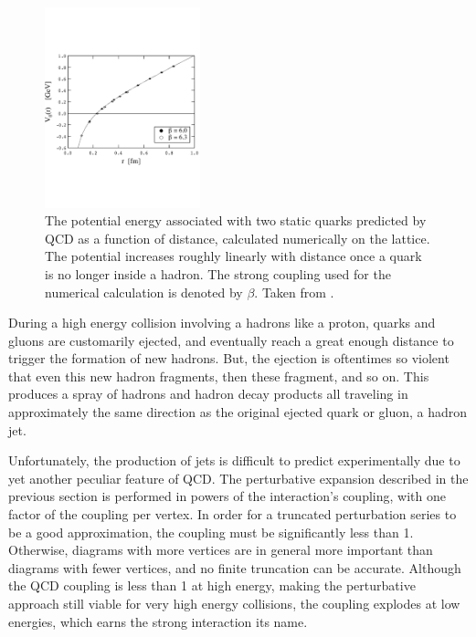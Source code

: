   \begin{figure}[h!]
    \centering
    \includegraphics[width=0.4\textwidth]{figures/lattice_potential_qcd.pdf}
    \caption[Tracker material budget.]{
      The potential energy associated with two static quarks predicted by QCD as a function of distance, calculated numerically on the lattice.
      The potential increases roughly linearly with distance once a quark is no longer inside a hadron.
      The strong coupling used for the numerical calculation is denoted by $\beta$.
      Taken from \cite{lattice_potential}.}
    \label{fig:QCDpotential}
  \end{figure}  

  During a high energy collision involving a hadrons like a proton, quarks and gluons are customarily ejected, and eventually reach a great enough distance to trigger the formation of new hadrons.
  But, the ejection is oftentimes so violent that even this new hadron fragments, then these fragment, and so on.
  This produces a spray of hadrons and hadron decay products all traveling in approximately the same direction as the original ejected quark or gluon, a hadron jet.

  Unfortunately, the production of jets is difficult to predict experimentally due to yet another peculiar feature of QCD.
  The perturbative expansion described in the previous section is performed in powers of the interaction's coupling, with one factor of the coupling per vertex.
  In order for a truncated perturbation series to be a good approximation, the coupling must be significantly less than 1.
  Otherwise, diagrams with more vertices are in general more important than diagrams with fewer vertices, and no finite truncation can be accurate.
  Although the QCD coupling is less than 1 at high energy, making the perturbative approach still viable for very high energy collisions, the coupling explodes at low energies, which earns the strong interaction its name.

